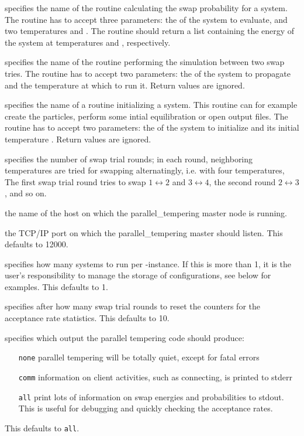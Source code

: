 \begin{arguments}
\item[\var{swap}] specifies the name of the routine calculating the swap probability for a
  system. The routine has to accept three parameters: the  of the system to
  evaluate, and two temperatures  and . The routine should return a list
  containing the energy of the system at temperatures  and , respectively.
\item[\var{perform}] specifies the name of the routine performing the simulation between two swap
  tries. The routine has to accept two parameters: the  of the system to
  propagate and the temperature  at which to run it. Return values are ignored.
\item[\var{init}] specifies the name of a routine initializing a system. This routine can for
  example create the particles, perform some intial equilibration or open output files.
  The routine has to accept two parameters: the  of the system to
  initialize and its initial temperature . Return values are ignored.
\item[\var{$R$}] specifies the number of swap trial rounds; in each round, neighboring temperatures
  are tried for swapping alternatingly, i.e. with four temperatures, The first swap trial round
  tries to swap $1\leftrightarrow 2$ and $3\leftrightarrow 4$, the second round $2\leftrightarrow
  3$, and so on.
\item[\var{master}] the name of the host on which the parallel_tempering master node is running.
\item[\var{port}] the TCP/IP port on which the parallel_tempering master should listen. This
  defaults to 12000.
\item[\var{$j_\mathrm{node}$}] specifies how many systems to run per \es{}-instance. If this is
  more than 1, it is the user's responsibility to manage the storage of configurations, see below
  for examples.  This defaults to 1.
\item[\var{$R_\mathrm{reset}$}] specifies after how many swap trial rounds to reset the counters
  for the acceptance rate statistics. This defaults to 10.
\item[\var{info}] specifies which output the parallel tempering code should produce:
  \begin{itemize}
  \item[\texttt{none}] parallel tempering will be totally quiet, except for fatal errors
  \item[\texttt{comm}] information on client activities, such as connecting, is printed to stderr
  \item[\texttt{all}] print lots of information on swap energies and probabilities to stdout. This
    is useful for debugging and quickly checking the acceptance rates.
  \end{itemize}
  This defaults to \texttt{all}.
\end{arguments}

